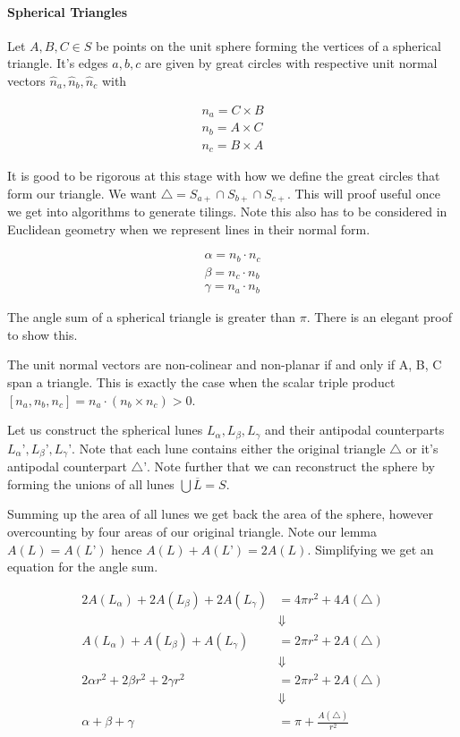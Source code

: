\paragraph{Spherical Triangles}\label{spherical-triangles}

Let \(A, B, C \in S\) be points on the unit sphere forming the vertices
of a spherical triangle. It's edges \(a,b,c\) are given by great circles
with respective unit normal vectors \(\hat n_a, \hat n_b, \hat n_c\)
with

\[\begin{split}
n_a = C \times B \\
n_b = A \times C \\
n_c = B \times A
\end{split}
\]

It is good to be rigorous at this stage with how we define the great
circles that form our triangle. We want
\(\triangle = S_{a+} \cap S_{b+} \cap S_{c+}\). This will proof useful
once we get into algorithms to generate tilings. Note this also has to
be considered in Euclidean geometry when we represent lines in their
normal form.

\[\begin{split}
\alpha= n_b \cdot n_c \\
\beta = n_c \cdot n_b \\
\gamma = n_a \cdot n_b
\end{split}\]

The angle sum of a spherical triangle is greater than \(\pi\). There is
an elegant proof to show this.

The unit normal vectors are non-colinear and non-planar if and only if
A, B, C span a triangle. This is exactly the case when the scalar triple
product \([n_a, n_b, n_c] = n_a \cdot (n_b \times n_c) > 0\).

Let us construct the spherical lunes \(L_\alpha, L_\beta, L_\gamma\) and
their antipodal counterparts \(L_\alpha’, L_\beta’, L_\gamma’\). Note
that each lune contains either the original triangle \(\triangle\) or
it's antipodal counterpart \(\triangle’\). Note further that we can
reconstruct the sphere by forming the unions of all lunes
\(\bigcup \overline{L} = S\).

Summing up the area of all lunes we get back the area of the sphere,
however overcounting by four areas of our original triangle. Note our
lemma \(A(L)=A(L’)\) hence \(A(L)+A(L’) = 2A(L)\). Simplifying we get an
equation for the angle sum.

\[\begin{split}
2A(L_\alpha) + 2A(L_\beta) + 2A(L_\gamma) &= 4 \pi r^2 + 4A(\triangle) \\
&\Downarrow \\
A(L_\alpha) + A(L_\beta) + A(L_\gamma) &= 2 \pi r^2 + 2A(\triangle) \\
&\Downarrow \\
2\alpha r^2 + 2\beta r^2 + 2\gamma r^2 &= 2\pi r^2 + 2A(\triangle) \\
&\Downarrow \\
\alpha + \beta + \gamma &= \pi + \frac{A(\triangle)}{r^2}
\end{split}\]

